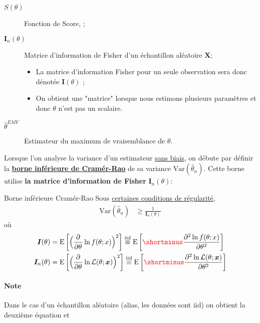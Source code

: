\documentclass[10pt, french]{article}
\begin{document}
\begin{multicols*}{2}
\begin{distributions}[Notation]
\begin{description}
	\item[$S(\theta)$]	Fonction de Score, ;
	\item[$\bm{I}_{n}(\theta)$]	Matrice d'information de Fisher d'un échantillon aléatoire $\bm{X}$;
		\begin{itemize}
		\item	La matrice d'information Fisher pour un seule observation sera donc dénotée $\bm{I}(\theta)$ ;
		\item	On obtient une "matrice" lorsque nous estimons plusieurs paramètres et donc $\theta$ n'est pas un scalaire.
		\end{itemize}
	\item[$\hat{\theta}^{EMV}$]	Estimateur du maximum de vraisemblance de $\theta$.
\end{description}
\end{distributions}

Lorsque l'on analyse la variance d'un estimateur \underline{sans biais}, on débute par définir la \hyperlink{cramer-rao}{\textbf{borne inférieure de Cramér-Rao}} de sa variance $\text{Var}(\hat{\theta}_{n})$. Cette borne utilise \textbf{la matrice d'information de Fisher} $\bm{I}_{n}(\theta)$:

\begin{algo}{\hypertarget{cramer-rao}{Borne inférieure Cramér-Rao}}
Sous \hyperlink{reg_cond}{\color{blue!40!green!80!black}certaines conditions de régularité},
\begin{align*}
	\text{Var}(\hat{\theta}_{n}) 
	&\geq	\frac{1}{\bm{I}_{n}(\theta)}
\end{align*}
où
\begin{align*}
	\bm{I}(\theta) 
	&=	\text{E}\left[\Big(\deriv{\theta}{} \ln f(\theta; x)\Big)^{2}\right]	
	\overset{\text{iid}}{\equiv}	\text{E}\left[{\color{red}\shortminus}\deriv[2]{\theta}{\ln f(\theta; x)}	\right]	\\
	\bm{I}_{n}(\theta) 
	&=	\text{E}\left[\Big(\deriv{\theta}{} \ln \mathcal{L}(\theta; \bm{x})\Big)^{2}\right]	
	\overset{\text{iid}}{\equiv}	\text{E}\left[{\color{red}\shortminus}\deriv[2]{\theta}{\ln \mathcal{L}(\theta; \bm{x})}\right]	
\end{align*}
\paragraph{Note}	Dans le cas d'un échantillon aléatoire (alias, les données sont iid) on obtient la deuxième équation et 
\end{algo}


\end{multicols*}
\end{document}
